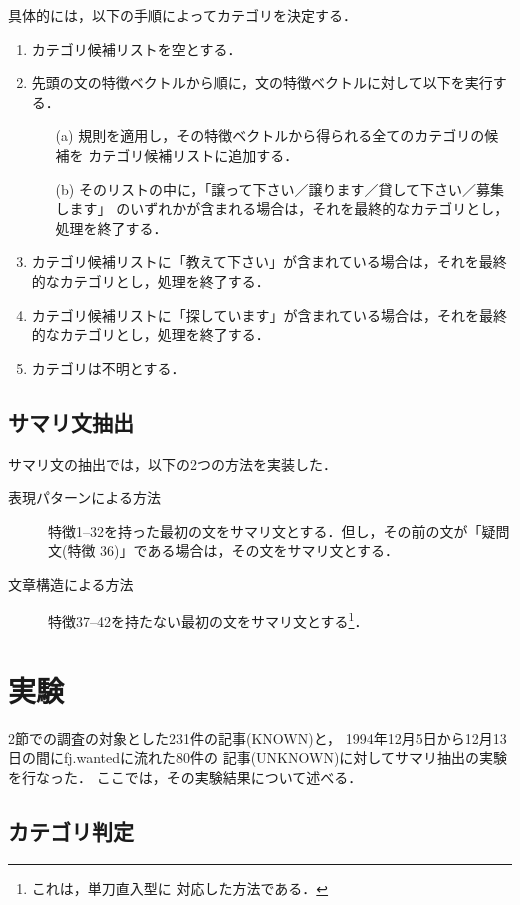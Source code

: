 具体的には，以下の手順によってカテゴリを決定する．
\begin{enumerate} 
\item カテゴリ候補リストを空とする．
\item 先頭の文の特徴ベクトルから順に，文の特徴ベクトルに対して以下を実行す
る．
\begin{enumerate} 
\item[(a)] 規則を適用し，その特徴ベクトルから得られる全てのカテゴリの候補を
カテゴリ候補リストに追加する．
\item[(b)] そのリストの中に，「譲って下さい／譲ります／貸して下さい／募集します」
のいずれかが含まれる場合は，それを最終的なカテゴリとし，処理を終了する．
\end{enumerate}
\item カテゴリ候補リストに「教えて下さい」が含まれている場合は，それを最終
的なカテゴリとし，処理を終了する．
\item カテゴリ候補リストに「探しています」が含まれている場合は，それを最終
的なカテゴリとし，処理を終了する．
\item カテゴリは不明とする．
\end{enumerate}

\subsection{サマリ文抽出}
サマリ文の抽出では，以下の2つの方法を実装した．
\begin{description} 
\item[表現パターンによる方法]
特徴1--32を持った最初の文をサマリ文とする．但し，その前の文が「疑問文(特徴
36)」である場合は，その文をサマリ文とする．
\item[文章構造による方法]
特徴37--42を持たない最初の文をサマリ文とする\footnote{これは，単刀直入型に
対応した方法である．}．
\end{description}

\section{実験}

2節での調査の対象とした231件の記事(KNOWN)と，
1994年12月5日から12月13日の間にfj.wantedに流れた80件の
記事(UNKNOWN)に対してサマリ抽出の実験を行なった．
ここでは，その実験結果について述べる．

\subsection{カテゴリ判定}

